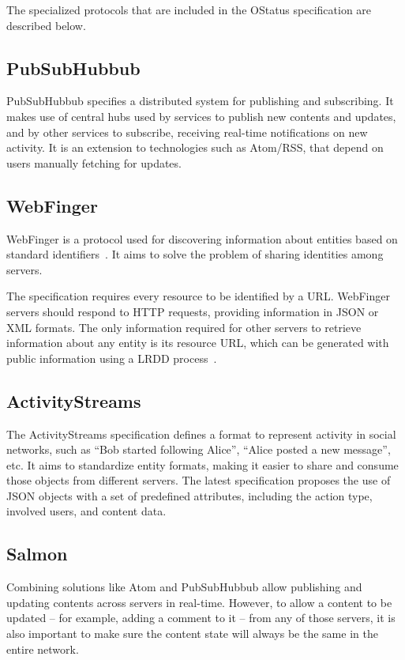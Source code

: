 The specialized protocols that are included in the OStatus specification
are described below.


\subsection{PubSubHubbub}

PubSubHubbub specifies a distributed system for publishing and
subscribing. It makes use of central hubs used by services to publish
new contents and updates, and by other services to subscribe, receiving
real-time notifications on new activity. It is an extension to
technologies such as Atom/RSS, that depend on users manually fetching
for updates.

\subsection{WebFinger}

WebFinger is a protocol used for discovering information about entities
based on standard identifiers~\cite{rfc7033}. It aims to solve the problem
of sharing identities among servers.

The specification requires every resource to be identified by a URL.
WebFinger servers should respond to HTTP requests, providing information
in JSON or XML formats. The only information required for other servers
to retrieve information about any entity is its resource URL, which can
be generated with public information using a LRDD process~\cite{lrdd2010}.

\subsection{ActivityStreams}

The ActivityStreams specification defines a format to represent activity
in social networks, such as ``Bob started following Alice'', ``Alice
posted a new message'', etc. It aims to standardize entity formats,
making it easier to share and consume those objects from different
servers. The latest specification proposes the use of JSON objects
with a set of predefined attributes, including the action type, involved
users, and content data.

\subsection{Salmon}

Combining solutions like Atom and PubSubHubbub allow publishing and
updating contents across servers in real-time. However, to allow a
content to be updated -- for example, adding a comment to it -- from any
of those servers, it is also important to make sure the content state
will always be the same in the entire network.

